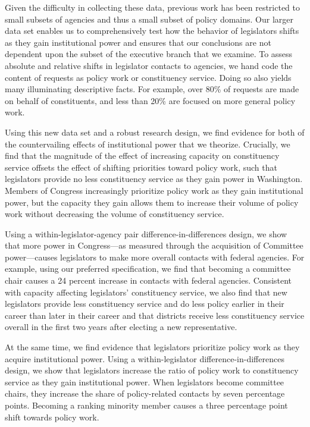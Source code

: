 \documentclass[12pt]{article}
\begin{document}
Given the difficulty in collecting these data, previous work has been restricted to small subsets of agencies and thus a small subset of policy domains. Our larger data set enables us to comprehensively test how the behavior of legislators shifts as they gain institutional power and ensures that our conclusions are not dependent upon the subset of the executive branch that we examine. To assess absolute and relative shifts in legislator contacts to agencies, we hand code the content of  requests as policy work or constituency service. Doing so also yields many illuminating descriptive facts. For example, over 80\% of requests are made on behalf of constituents, and less than 20\% are focused on more general policy work. 




Using this new data set and a robust research design, we find evidence for both of the countervailing effects of institutional power that we theorize. Crucially, we find that the magnitude of the effect of increasing capacity on constituency service offsets the effect of shifting priorities toward policy work, such that legislators provide no less constituency service as they gain power in Washington. Members of Congress increasingly prioritize policy work as they gain institutional power, but the capacity they gain allows them to increase their volume of policy work without decreasing the volume of constituency service.

Using a within-legislator-agency pair difference-in-differences design, we show that more power in Congress---as measured through the acquisition of Committee power---causes legislators to make more overall contacts with federal agencies. For example, using our preferred specification, we find that becoming a committee chair causes a 24 percent increase in contacts with federal agencies. Consistent with capacity affecting legislators' constituency service, we also find that new legislators provide less constituency service and do less policy earlier in their career than later in their career and that districts receive less constituency service overall in the first two years after electing a new representative.  



At the same time, we find evidence that legislators prioritize policy work as they acquire institutional power. Using a within-legislator difference-in-differences design, we show that legislators increase the ratio of policy work to constituency service as they gain institutional power. When legislators become committee chairs, they increase the share of policy-related contacts by seven percentage points. Becoming a ranking minority member causes a three percentage point shift towards policy work.
\end{document}
